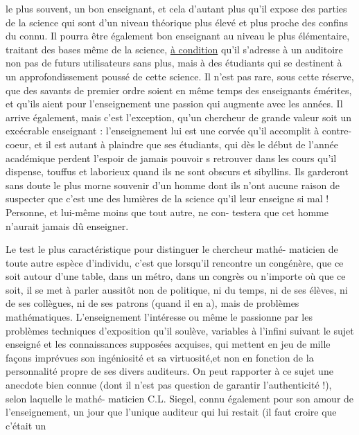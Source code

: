 
le plus souvent, un bon enseignant, et cela d'autant plus qu'il expose des
parties de la science qui sont d'un niveau théorique plus élevé et plus
proche des confins du connu. Il pourra être également bon enseignant au
niveau le plus élémentaire, traitant des bases même de la science, \uline{à condition}
qu'il s'adresse à un auditoire non pas de futurs utilisateurs sans plus,
mais à des étudiants qui se destinent à un approfondissement poussé de cette
science. Il n'est pas rare, sous cette réserve, que des savants de premier
ordre soient en même temps des enseignants émérites, et qu'ils aient pour
l'enseignement une passion qui augmente avec les années. Il arrive également,
mais c'est l'exception, qu'un chercheur de grande valeur soit un excécrable
enseignant : l'enseignement lui est une corvée qu'il accomplit à contre-coeur,
et il est autant à plaindre que ses étudiants, qui dès le début de l'année
académique perdent l'espoir de jamais pouvoir s retrouver dans les cours
qu'il dispense, touffus et laborieux quand ils ne sont obscurs et sibyllins.
Ils garderont sans doute le plus morne souvenir d'un homme dont ils n'ont
aucune raison de suspecter que c'est une des lumières de la science qu'il
leur enseigne si mal ! Personne, et lui-même moins que tout autre, ne con-%
testera que cet homme n'aurait jamais dû enseigner.

Le test le plus caractéristique pour distinguer le chercheur mathé-%
maticien de toute autre espèce d'individu, c'est que lorsqu'il rencontre
un congénère, que ce soit autour d'une table, dans un métro, dans un congrès
ou n'importe où que ce soit, il se met à parler aussitôt non de politique,
ni du temps, ni de ses élèves, ni de ses collègues, ni de ses patrons (quand
il en a), mais de problèmes mathématiques. L'enseignement l'intéresse ou
même le passionne par les problèmes techniques d'exposition qu'il soulève,
variables à l'infini suivant le sujet enseigné et les connaissances supposées
acquises, qui mettent en jeu de mille façons imprévues son ingéniosité et
sa virtuosité,et non en fonction de la personnalité propre de ses divers
auditeurs. On peut rapporter à ce sujet une anecdote bien connue (dont il
n'est pas question de garantir l'authenticité !), selon laquelle le mathé-%
maticien C.L. Siegel, connu également pour son amour de l'enseignement,
un jour que l'unique auditeur qui lui restait (il faut croire que c'était un

